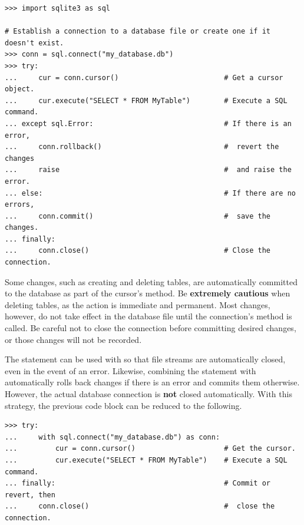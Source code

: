 \begin{lstlisting}
>>> import sqlite3 as sql

# Establish a connection to a database file or create one if it doesn't exist.
>>> conn = sql.connect("my_database.db")
>>> try:
...     cur = conn.cursor()                         # Get a cursor object.
...     cur.execute("SELECT * FROM MyTable")        # Execute a SQL command.
... except sql.Error:                               # If there is an error,
...     conn.rollback()                             #  revert the changes
...     raise                                       #  and raise the error.
... else:                                           # If there are no errors,
...     conn.commit()                               #  save the changes.
... finally:
...     conn.close()                                # Close the connection.
\end{lstlisting}

\begin{warn} %
Some changes, such as creating and deleting tables, are automatically committed to the database as part of the cursor's  method.
Be \textbf{extremely cautious} when deleting tables, as the action is immediate and permanent.
Most changes, however, do not take effect in the database file until the connection's  method is called.
Be careful not to close the connection before committing desired changes, or those changes will not be recorded.
\end{warn}

The  statement can be used with  so that file streams are automatically closed, even in the event of an error.
Likewise, combining the  statement with  automatically rolls back changes if there is an error and commits them otherwise.
However, the actual database connection is \textbf{not} closed automatically.
With this strategy, the previous code block can be reduced to the following.

\begin{lstlisting}
>>> try:
...     with sql.connect("my_database.db") as conn:
...         cur = conn.cursor()                     # Get the cursor.
...         cur.execute("SELECT * FROM MyTable")    # Execute a SQL command.
... finally:                                        # Commit or revert, then
...     conn.close()                                #  close the connection.
\end{lstlisting}

